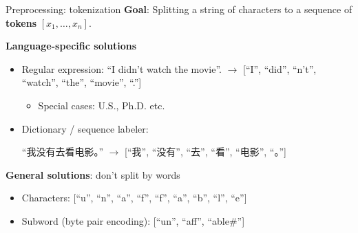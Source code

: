 \documentclass[usenames,dvipsnames,notes,11pt,aspectratio=169]{beamer}
\newcommand{\pdfnote}[1]{}
\begin{document}
\begin{frame}
    {Preprocessing: tokenization}
    \textbf{Goal}: Splitting a string of characters to a sequence of \textbf{tokens} $[x_1, \ldots, x_n]$.

    \textbf{Language-specific solutions}\\
    \begin{itemize}
        \itemsep1em
        \item Regular expression: ``I didn't watch the movie''. $\rightarrow$ [``I'', ``did'', ``n't'', ``watch'', ``the'', ``movie'', ``.''] 
            \begin{itemize}
                \item Special cases: U.S., Ph.D. etc.
            \end{itemize}
        \item Dictionary / sequence labeler: 
            \begin{CJK*}{UTF8}{gbsn}
                ``我没有去看电影。'' $\rightarrow$ [``我'', ``没有'', ``去'', ``看'', ``电影'', ``。'']
            \end{CJK*}
    \end{itemize}

    \pause
    \textbf{General solutions}: don't split by words\\
    \begin{itemize}
        \item Characters:
            [``u'', ``n'', ``a'', ``f'', ``f'', ``a'', ``b'', ``l'', ``e''] 
        \item Subword (\eg byte pair encoding):
            [``un'', ``aff'', ``able\#'']
    \end{itemize}
    \pdfnote{
        Note that for contractions like didn't. We can tokenize it into either did n't or didn 't. Both are okay as long as it's consistent.
        English tokenization gets more complex when there is punctuations or special symbols.
    }
    \pdfnote{Tokenization can have important impact on the performance of downstream learning algorithms.
    }
    \pdfnote{
        Using character sequences (or even byte sequences) we impose mininal prior knowledge on what is a word. Given enough data, the model can probably figure out a reasonable unit of the characters based on their frequencies. But one downside in this approach is that the sequence is now much longer, and the computation time of many algorithms grows with sequence length, which will be expensive for large-scale training.
    }
    \pdfnote{
        A middle ground is to use subword, a unit larger than characters but smaller than words.
        This is commonly used in large-scale models nowadays.
        The BPE algorithms is a simple technique from data compression.
        The basic idea is to recursively merge frequently adjacent symbols into a new symbol (or token).
        The subword found through this algorithm often corresponds to morphemes.
    }
\end{frame}
\end{document}
